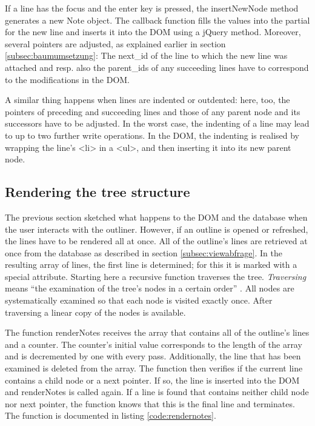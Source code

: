 If a line has the focus and the enter key is pressed, the {\selectfont insertNewNode} method generates a new Note object. The callback function fills the values into the partial for the new line and inserts it into the DOM using a jQuery method. Moreover, several pointers are adjusted, as explained earlier in section \ref{subsec:baumumsetzung}: The {\selectfont next\_id} of the line to which the new line was attached and resp. also the {\selectfont parent\_id}s of any succeeding lines have to correspond to the modifications in the DOM.

A similar thing happens when lines are indented or outdented: here, too, the pointers of preceding and succeeding lines and those of any parent node and its successors have to be adjusted. In the worst case, the indenting of a line may lead to up to two further write operations. In the DOM, the indenting is realised by wrapping the line's {\selectfont <li>} in a {\selectfont <ul>}, and then inserting it into its new parent node.

\subsection{Rendering the tree structure}
\label{subsec:baum-rendern}

The previous section sketched what happens to the DOM and the database when the user interacts with the outliner. However, if an outline is opened or refreshed, the lines have to be rendered all at once. All of the outline's lines are retrieved at once from the database as described in section \ref{subsec:viewabfrage}. In the resulting array of lines, the first line is determined; for this it is marked with a special attribute. Starting here a recursive function traverses the tree. \textit{Traversing} means \enquote{the examination of the tree's nodes in a certain order} . All nodes are systematically examined so that each node is visited exactly once. After traversing a linear copy of the nodes is available.

The function {\selectfont renderNotes} receives the array that contains all of the outline's lines and a counter. The counter's initial value corresponds to the length of the array and is decremented by one with every pass. Additionally, the line that has been examined is deleted from the array. The function then verifies if the current line contains a child node or a next pointer. If so, the line is inserted into the DOM and {\selectfont renderNotes} is called again. If a line is found that contains neither child node nor next pointer, the function knows that this is the final line and terminates. The function is documented in listing \ref{code:rendernotes}.


